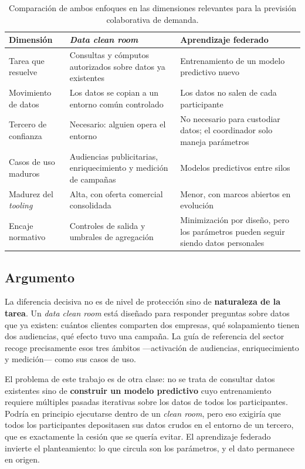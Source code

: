 \begin{table}[H]
  \centering
  \caption[Comparación entre aprendizaje federado y \emph{data clean rooms}]{Comparación de ambos
  enfoques en las dimensiones relevantes para la previsión colaborativa de demanda.}
  \label{tab:dcr}
  \begin{tabular}{p{3.4cm}p{4.7cm}p{4.7cm}}
    \toprule
    Dimensión & \emph{Data clean room} & Aprendizaje federado \\
    \midrule
    Tarea que resuelve &
      Consultas y cómputos autorizados sobre datos ya existentes &
      Entrenamiento de un modelo predictivo nuevo \\
    Movimiento de datos &
      Los datos se copian a un entorno común controlado &
      Los datos no salen de cada participante \\
    Tercero de confianza &
      Necesario: alguien opera el entorno &
      No necesario para custodiar datos; el coordinador solo maneja parámetros \\
    Casos de uso maduros &
      Audiencias publicitarias, enriquecimiento y medición de campañas &
      Modelos predictivos entre silos \\
    Madurez del \emph{tooling} &
      Alta, con oferta comercial consolidada &
      Menor, con marcos abiertos en evolución \\
    Encaje normativo &
      Controles de salida y umbrales de agregación &
      Minimización por diseño, pero los parámetros pueden seguir siendo datos personales \\
    \bottomrule
  \end{tabular}
\end{table}

\subsection{Argumento}

La diferencia decisiva no es de nivel de protección sino de \textbf{naturaleza de la tarea}. Un
\emph{data clean room} está diseñado para responder preguntas sobre datos que ya existen: cuántos
clientes comparten dos empresas, qué solapamiento tienen dos audiencias, qué efecto tuvo una
campaña. La guía de referencia del sector \parencite{iabtechlab2024} recoge precisamente esos tres
ámbitos —activación de audiencias, enriquecimiento y medición— como sus casos de uso.

El problema de este trabajo es de otra clase: no se trata de consultar datos existentes sino de
\textbf{construir un modelo predictivo} cuyo entrenamiento requiere múltiples pasadas iterativas
sobre los datos de todos los participantes. Podría en principio ejecutarse dentro de un
\emph{clean room}, pero eso exigiría que todos los participantes depositasen sus datos crudos en el
entorno de un tercero, que es exactamente la cesión que se quería evitar. El aprendizaje federado
invierte el planteamiento: lo que circula son los parámetros, y el dato permanece en origen.

